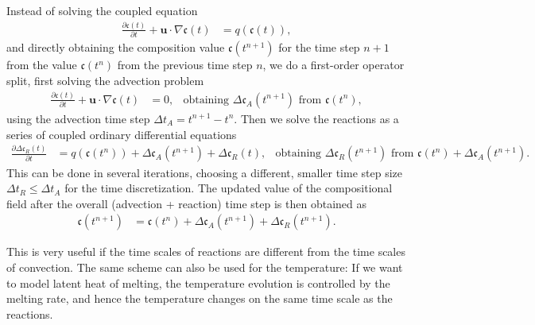 \documentclass{article}
\begin{document}
Instead of solving the coupled equation
\begin{align}
  \frac{\partial \mathfrak{c}(t)}{\partial t} + \mathbf u\cdot\nabla \mathfrak{c}(t)
  &=
  q(\mathfrak{c}(t)),
\end{align}
and directly obtaining the composition value $\mathfrak{c}(t^{n+1})$ for the time step $n+1$ from the value $\mathfrak{c}(t^{n})$ from the previous time step $n$, we do a first-order operator split, first solving the advection problem
\begin{align}
  \frac{\partial \mathfrak{c}(t)}{\partial t} + \mathbf u\cdot\nabla \mathfrak{c}(t)
  &=
  0,
  &
  \text{obtaining } \Delta \mathfrak{c}_A(t^{n+1}) \text{ from } \mathfrak{c}(t^{n}),
\end{align}
using the advection time step $\Delta t_A = t^{n+1} - t^{n}$.
Then we solve the reactions as a series of coupled ordinary differential equations 
\begin{align}
  \frac{\partial \Delta \mathfrak{c}_R(t)}{\partial t} 
  &=
  q(\mathfrak{c}(t^n))+\Delta \mathfrak{c}_A(t^{n+1})+\Delta \mathfrak{c}_R(t),
  &
  \text{obtaining } \Delta \mathfrak{c}_R(t^{n+1}) \text{ from } \mathfrak{c}(t^n)+\Delta \mathfrak{c}_A(t^{n+1}).
\end{align}
This can be done in several iterations, choosing a different, smaller time step size $\Delta t_R \leq \Delta t_A$ for the time discretization. 
The updated value of the compositional field after the overall (advection + reaction) time step is then obtained as
\begin{align}
  \mathfrak{c}(t^{n+1}) 
  &=
  \mathfrak{c}(t^{n}) + \Delta \mathfrak{c}_A(t^{n+1})+\Delta \mathfrak{c}_R(t^{n+1}).
\end{align}

This is very useful if the time scales of reactions are different from the time scales of convection. 
The same scheme can also be used for the temperature: If we want to model latent heat of melting, the temperature evolution is controlled by the melting rate, and hence the temperature changes on the same time scale as the reactions. 
\end{document}
